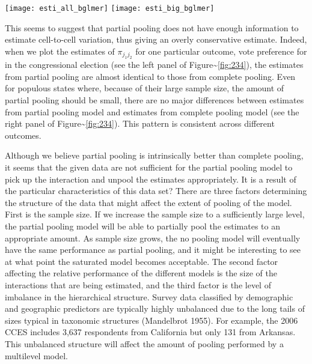 \begin{figure*}[p!]
  \centering
  \texttt{[image: esti\_all\_bglmer]}
  \texttt{[image: esti\_big\_bglmer]}
  \caption{\em Left panel: Cell proportion estimates for three models of vote
    intention. Each line is a state. The
    partial pooling model pools so much that it is indistinguishable from
    complete pooling. Right panel: The same estimates for the 10 most populous
    states. Still, partial pooling estimates are similar to complete pooling
    estimates.}
  \label{fig:234}
\end{figure*}

This seems to suggest that partial pooling does not have enough
information to estimate cell-to-cell variation, thus giving an overly
conservative estimate. Indeed, when we plot the estimates of
\(\pi_{j_1j_2}\) for one particular outcome, vote preference for in the
congressional election (see the left panel of
Figure\textasciitilde{}\ref{fig:234}), the estimates from partial
pooling are almost identical to those from complete pooling. Even for
populous states where, because of their large sample size, the amount of
partial pooling should be small, there are no major differences between
estimates from partial pooling model and estimates from complete pooling
model (see the right panel of Figure\textasciitilde{}\ref{fig:234}).
This pattern is consistent across different outcomes.

Although we believe partial pooling is intrinsically better than
complete pooling, it seems that the given data are not sufficient for
the partial pooling model to pick up the interaction and unpool the
estimates appropriately. It is a result of the particular
characteristics of this data set? There are three factors determining
the structure of the data that might affect the extent of pooling of the
model. First is the sample size. If we increase the sample size to a
sufficiently large level, the partial pooling model will be able to
partially pool the estimates to an appropriate amount. As sample size
grows, the no pooling model will eventually have the same performance as
partial pooling, and it might be interesting to see at what point the
saturated model becomes acceptable. The second factor affecting the
relative performance of the different models is the size of the
interactions that are being estimated, and the third factor is the level
of imbalance in the hierarchical structure. Survey data classified by
demographic and geographic predictors are typically highly unbalanced
due to the long tails of sizes typical in taxonomic structures
(Mandelbrot 1955). For example, the 2006 CCES includes 3,637 respondents
from California but only 131 from Arkansas. This unbalanced structure
will affect the amount of pooling performed by a multilevel model.

